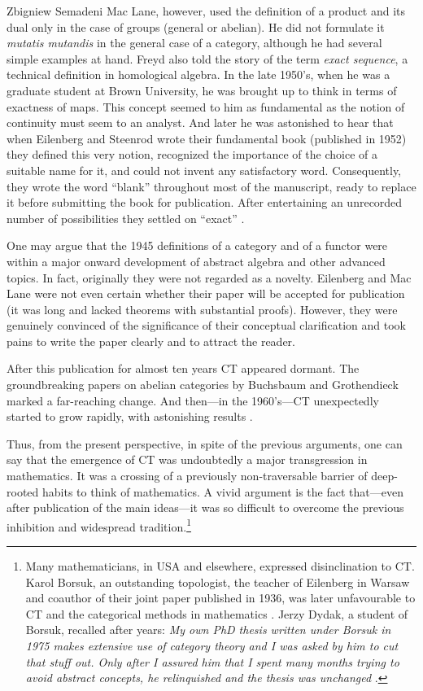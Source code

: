 \begin{artengenv}{Zbigniew Semadeni}
\noindent Mac Lane, however, used the definition of a product and its dual only in 
the case of groups (general or abelian). He did not formulate it \textit{mutatis 
mutandis} in the general case of a category, although he had several simple examples 
at hand. 
Freyd also told the story of the term \textit{exact sequence}, a technical 
definition in homological algebra. In the late 1950's, when he was a graduate student 
at Brown University, he was brought up to think in terms of exactness of maps. 
This concept seemed to him as fundamental as the notion of continuity must seem 
to an analyst. And later he was astonished to hear that when Eilenberg and  
Steenrod wrote their fundamental book \parencite{Steenrod} (published in 1952) they 
defined this very notion, recognized the importance of the choice of a suitable 
name for it, and could not invent any satisfactory word. Consequently, they 
wrote the word ``blank'' throughout most of the manuscript, ready to replace it 
before submitting the book for publication. After entertaining an unrecorded number 
of possibilities they settled on ``exact'' \parencite[p.157]{Freyd}. 

One may argue that the 1945 definitions of a category and of a functor were within a 
major onward development of abstract algebra and other advanced topics. In fact, 
originally they were not regarded as a novelty. Eilenberg and Mac Lane were not even 
certain whether their paper will be accepted for publication (it was long and lacked 
theorems with substantial proofs). However, they were genuinely convinced of the 
significance of their conceptual clarification and took pains to write the paper 
clearly and to attract the reader. 

After this publication for almost ten years CT appeared dormant. The groundbreaking 
papers on abelian categories by Buchsbaum and Gro\-then\-dieck marked 
a far-reaching change. And then---in the 1960's---CT unexpectedly started to 
grow rapidly, with astonishing results \parencite[pp.338--339, 341--361]{Century}.

Thus, from the present perspective, in spite of the previous arguments, one can say 
that the emergence of CT was undoubtedly a major transgression in mathematics. 
It was a crossing of a previously non-traversable barrier of deep-rooted habits to 
think of mathematics. A vivid argument is the fact that---even after publication 
of the main ideas---it was so difficult to overcome the previous inhibition 
and widespread tradition.\footnote{Many mathematicians, in USA and elsewhere, 
expressed disinclination to CT. Karol Borsuk, an outstanding topologist, the 
teacher of Eilenberg in Warsaw and coauthor of their joint paper published in 1936, 
was later unfavourable to CT and the categorical methods in mathematics 
\parencite[p.30]{Jackowski}. Jerzy Dydak, a student of Borsuk, recalled after years: 
\textit{My own PhD thesis written under Borsuk in 1975 makes extensive use 
of category theory and I was asked by him to cut that stuff out. Only after 
I assured him that I spent many months trying to avoid abstract concepts, he 
relinquished and the thesis was unchanged} \parencite[p.92]{Dydak}.} %


\end{artengenv}
